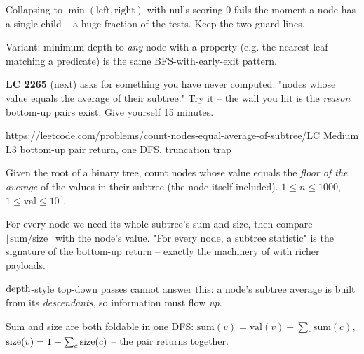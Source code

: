 \begin{warningbox}
Collapsing to $\min(\text{left},\text{right})$ with nulls scoring $0$ fails the moment a
node has a single child -- a huge fraction of the tests. Keep the two guard lines.
\end{warningbox}
Variant: minimum depth to \emph{any} node with a property (e.g. the nearest leaf matching
a predicate) is the same BFS-with-early-exit pattern.

\begin{attemptgate}
\textbf{LC 2265} (next) asks for something you have never computed: "nodes whose
value equals the average of their subtree." Try it -- the wall you hit is the
\emph{reason} bottom-up pairs exist. Give yourself 15 minutes.
\end{attemptgate}

  {https://leetcode.com/problems/count-nodes-equal-average-of-subtree/}{LC Medium L3}
  {bottom-up pair return, one DFS, truncation trap}

\begin{problemstatement}
Given the root of a binary tree, count nodes whose value equals the
\emph{floor of the average} of the values in their subtree (the node itself included).
$1 \le n \le 1000$, $1 \le \mathrm{val} \le 10^5$.
\end{problemstatement}

For every node we need its whole subtree's sum and size, then compare
$\lfloor \mathrm{sum}/\mathrm{size} \rfloor$ with the node's value. "For every node, a
subtree statistic" is the signature of the bottom-up return -- exactly the machinery of
 with richer payloads.

\begin{observation}
$\operatorname{depth}$-style top-down passes cannot answer this: a node's subtree average is built
from its \emph{descendants}, so information must flow \emph{up}.
\end{observation}
\begin{observation}
Sum and size are both foldable in one DFS: $\mathrm{sum}(v) = \mathrm{val}(v) +
\sum_c \mathrm{sum}(c)$, $\operatorname{size}(v) = 1 + \sum_c \operatorname{size}(c)$ -- the pair returns together.
\end{observation}

